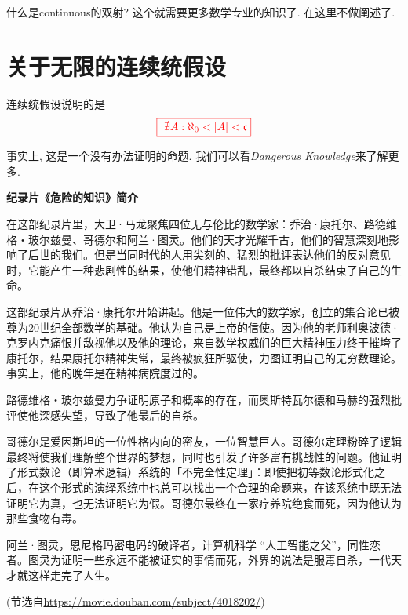什么是continuous的双射? 这个就需要更多数学专业的知识了. 在这里不做阐述了. 

\section{关于无限的连续统假设}
 连续统假设说明的是
 \[
    \textcolor{red}{\fbox{\text{ $\nexists A: \aleph_{0} < |A| < \mathfrak{c}$}}}
  \]
  
  事实上, 这是一个没有办法证明的命题. 我们可以看\textit{Dangerous Knowledge}来了解更多. 
  
  \begin{pas}
  \begin{center}
  	\large\textbf{纪录片《危险的知识》简介}
  \end{center}	
    
    在这部纪录片里，大卫·马龙聚焦四位无与伦比的数学家：乔治·康托尔、路德维格・玻尔兹曼、哥德尔和阿兰·图灵。他们的天才光耀千古，他们的智慧深刻地影响了后世的我们。但是当同时代的人用尖刻的、猛烈的批评表达他们的反对意见时，它能产生一种悲剧性的结果，使他们精神错乱，最终都以自杀结束了自己的生命。
  
    这部纪录片从乔治·康托尔开始讲起。他是一位伟大的数学家，创立的集合论已被尊为20世纪全部数学的基础。他认为自己是上帝的信使。因为他的老师利奥波德·克罗内克痛恨并敌视他以及他的理论，来自数学权威们的巨大精神压力终于摧垮了康托尔，结果康托尔精神失常，最终被疯狂所驱使，力图证明自己的无穷数理论。事实上，他的晚年是在精神病院度过的。
  
    路德维格・玻尔兹曼力争证明原子和概率的存在，而奥斯特瓦尔德和马赫的强烈批评使他深感失望，导致了他最后的自杀。

    哥德尔是爱因斯坦的一位性格内向的密友，一位智慧巨人。哥德尔定理粉碎了逻辑最终将使我们理解整个世界的梦想，同时也引发了许多富有挑战性的问题。他证明了形式数论（即算术逻辑）系统的「不完全性定理」：即使把初等数论形式化之后，在这个形式的演绎系统中也总可以找出一个合理的命题来，在该系统中既无法证明它为真，也无法证明它为假。哥德尔最终在一家疗养院绝食而死，因为他认为那些食物有毒。
	
    阿兰·图灵，恩尼格玛密电码的破译者，计算机科学 “人工智能之父”，同性恋者。图灵为证明一些永远不能被证实的事情而死，外界的说法是服毒自杀，一代天才就这样走完了人生。

(节选自\url{https://movie.douban.com/subject/4018202/})
  \end{pas}




